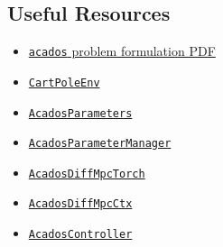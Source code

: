 \documentclass{article}
\newcommand{\acados}{\texttt{acados}}
\begin{document}
\subsection*{Useful Resources}
\begin{itemize}
	\item \href{https://github.com/acados/acados/blob/master/docs/problem_formulation/problem_formulation_ocp_mex.pdf}{\acados{} problem formulation PDF}
	\item \href{https://github.com/leap-c/leap-c/blob/main/leap_c/examples/cartpole/env.py#L24}{\texttt{CartPoleEnv}}
	\item \href{https://github.com/leap-c/leap-c/blob/main/leap_c/ocp/acados/parameters.py#L15}{\texttt{AcadosParameters}}
	\item \href{https://github.com/leap-c/leap-c/blob/main/leap_c/ocp/acados/parameters.py#L70}{\texttt{AcadosParameterManager}}
	\item \href{https://github.com/leap-c/leap-c/blob/main/leap_c/ocp/acados/torch.py#L18}{\texttt{AcadosDiffMpcTorch}}
	\item \href{https://github.com/leap-c/leap-c/blob/main/leap_c/ocp/acados/diff_mpc.py#L30}{\texttt{AcadosDiffMpcCtx}}
	\item \href{https://github.com/leap-c/leap-c/blob/main/leap_c/ocp/acados/controller.py#L13}{\texttt{AcadosController}}
\end{itemize}


\end{document}
